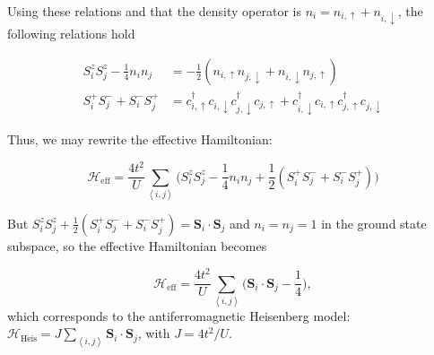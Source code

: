 Using these relations and that the density operator is $n_i = n_{i,\uparrow} + n_{i,\downarrow}$, the following relations hold

\begin{equation}
\begin{split}
S_i^z S_j^z - \frac{1}{4} n_i n_j &= -\frac{1}{2} ( n_{i,\uparrow} n_{j,\downarrow} + n_{i,\downarrow} n_{j,\uparrow} ) \\
S_i^+ S_j^- + S_i^- S_j^+ &= c_{i,\uparrow}^\dagger c_{i,\downarrow} c_{j,\downarrow}^\dagger  c_{j,\uparrow} +  c_{i,\downarrow}^\dagger c_{i,\uparrow} c_{j,\uparrow}^\dagger  c_{j,\downarrow}
\end{split}
\end{equation}

Thus, we may rewrite the effective Hamiltonian:

\begin{equation}
\mathcal{H}_{\text{eff}} = \frac{4t^2}{U} \sum_{\left\langle i, j \right\rangle} \bigg( S_i^z S_j^z - \frac{1}{4} n_i n_j + \frac{1}{2} ( S_i^+ S_j^- + S_i^- S_j^+ ) \bigg)
\end{equation}

But $S_i^z S_j^z + \frac{1}{2} ( S_i^+ S_j^- + S_i^- S_j^+) = \bm S_i \cdot \bm S_j$ and $n_i = n_j = 1$ in the ground state subspace, so the effective Hamiltonian becomes

\begin{equation}
\mathcal{H}_{\text{eff}} = \frac{4t^2}{U} \sum_{\left\langle i, j \right\rangle} \bigg( \bm S_i \cdot \bm S_j  - \frac{1}{4}  \bigg),
\end{equation}
which corresponds to the antiferromagnetic Heisenberg model: $\mathcal{H}_{\text{Heis}} = J \sum_{\left\langle i, j \right\rangle} \bm S_i \cdot \bm S_j $, with $J = 4 t^2 / U$.